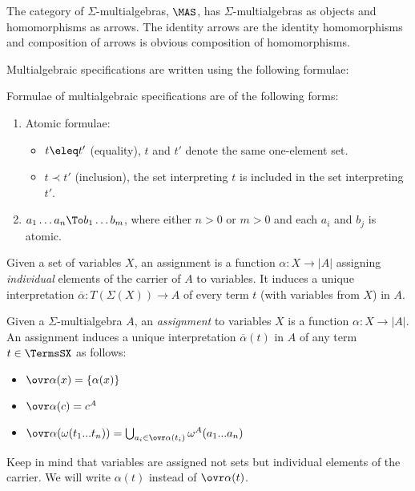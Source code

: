 \begin{definition} 
The category of $\Sigma$-multialgebras, $\MAS$, has $\Sigma$-multialgebras as
objects and homomorphisms as arrows.  The identity arrows are the identity
homomorphisms and composition of arrows is obvious composition of
homomorphisms.
\end{definition} 
Multialgebraic specifications are written using the following formulae:
%
\begin{definition}
Formulae of multialgebraic specifications are of the following forms:
\begin{enumerate}\MyLPar
\item Atomic formulae:
\begin{itemize}\MyLPar
\item $t \eleq  t'$ (equality), $t$ and $t'$ denote the same one-element set.
\item $t \prec t'$ (inclusion), the set interpreting $t$ is included in
the set interpreting $t'$.
\end{itemize}
\item $a_1 \ldots a_n \To b_1 \ldots b_m$, where either $n>0$ or $m>0$ and
each $a_i$ and $b_j$ is atomic.
\end{enumerate}
\end{definition}
%
Given a set of variables $X$, an assignment is a function $\alpha: X \to |A|$ 
assigning {\em individual} elements of the carrier of $A$ to variables. It induces a unique
interpretation $\overline{\alpha}: T(\Sigma(X)) \to A$ of every term $t$
(with variables from $X$) in
$A$.
\begin{definition} Given a $\Sigma$-multialgebra $A$, an {\it assignment} to 
variables $X$ is a function $\alpha:X \to |A|$. An assignment induces a
unique interpretation $\overline{\alpha}(t)$ in $A$ of any term $t \in \TermsSX$ as
follows:
\begin{itemize}\MyLPar
\item $\ovr\alpha(x)=\{\alpha(x)\}$
\item $\ovr\alpha(c)=c^A$
\item $\ovr\alpha(\omega(t_1...t_n)) = \bigcup_{a_{i}\in\ovr\alpha(t_{i})}\omega^A(a_1...a_n)$
\end{itemize}
\end{definition}
Keep in mind that variables are assigned not sets but individual
elements of the carrier. 
We will write $\alpha(t)$ instead of $\ovr\alpha(t)$.
 
